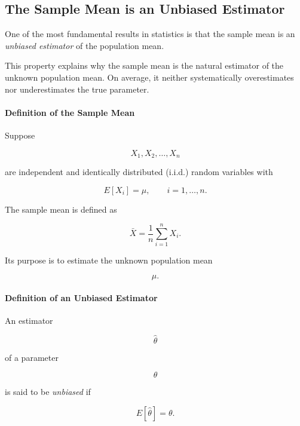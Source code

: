 \documentclass[11pt]{article}
\begin{document}
	\begin{mdframed}[
		linewidth=0.8pt,
		roundcorner=6pt,
		backgroundcolor=gray!5,
		linecolor=gray!60,
		innertopmargin=10pt,
		innerbottommargin=10pt,
		innerleftmargin=10pt,
		innerrightmargin=10pt
		]
		
		\subsection*{The Sample Mean is an Unbiased Estimator}
		
		One of the most fundamental results in statistics is that the sample mean is
		an \emph{unbiased estimator} of the population mean.
		
		This property explains why the sample mean is the natural estimator of the
		unknown population mean. On average, it neither systematically overestimates
		nor underestimates the true parameter.
		
		\bigskip
		
		\paragraph{Definition of the Sample Mean}
		
		Suppose
		
		\[
		X_1,X_2,\ldots,X_n
		\]
		
		are independent and identically distributed (i.i.d.) random variables with
		
		\[
		E[X_i]=\mu,
		\qquad
		i=1,\ldots,n.
		\]
		
		The sample mean is defined as
		
		\[
		\boxed{
			\bar X
			=
			\frac1n
			\sum_{i=1}^{n}X_i.
		}
		\]
		
		Its purpose is to estimate the unknown population mean
		
		\[
		\mu.
		\]
		
		\bigskip
		
		\paragraph{Definition of an Unbiased Estimator}
		
		An estimator
		
		\[
		\hat\theta
		\]
		
		of a parameter
		
		\[
		\theta
		\]
		
		is said to be \emph{unbiased} if
		
		\[
		\boxed{
			E[\hat\theta]
			=
			\theta.
		}
		\]
		

\end{mdframed}
\end{document}
